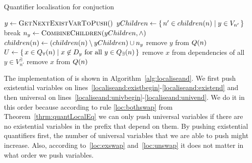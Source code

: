 \documentclass[
  digital, %
  twoside, %
  table,   %
  nolof,     %
  nolot,     %
]{fithesis3}
\let\setbuilder\set
\newcommand{\simpleset}[1]{\{{#1}\}}
\renewcommand{\set}[1]{\normalexpandarg\IfSubStr{#1}{|}{\setbuilder{#1}}{\simpleset{#1}}}
\theoremstyle{definition}
\theoremstyle{remark}
\newcommand{\vars}[1]{V_{#1}}
\newcommand{\evars}[1]{V_{#1}^{\exists}}
\begin{document}
\begin{algorithm}
  \caption{Quantifier localisation for conjuction}
  \label{alg:localiseand}
  \begin{algorithmic}[1]
      \label{localiseand:existbegin}
        \State $y \gets \Call{GetNextExistVarToPush}{\null}$\label{localiseand:getevar}
        \State $yChildren \gets \set{n' \in \children{n} | y \in \vars{n'}}$\label{localiseand:egetchildren}
        \label{localiseand:echildtest}%
          \State break
        \Else
          \State $n_y \gets \Call{CombineChildren}{yChildren, {\land}}$\label{localiseand:ecombine}
          \State $children({n}) \gets (children({n}) \setminus yChildren) \cup n_y$\label{localiseand:echildrenupdate}
          \State {}\label{localiseand:epush}
          \State remove $y$ from $Q({n})$\label{localiseand:eremove}
        \EndIf
      \EndWhile\label{localiseand:existend}
      \State $U \gets \set{x \in \uprefix{n} | x \not\in D_y \text{ for all } y \in \eprefix{n}}$\label{localiseand:upossible}
      \label{localiseand:univbegin}
            \State {}\label{localiseand:upush}
          \Else
            \State remove $x$ from dependencies of all $y \in \evars{n'}$\label{localiseand:uremovedep}
          \EndIf
        \EndFor
        \State remove $x$ from $Q({n})$\label{localiseand:uremove}
      \EndFor\label{localiseand:univend}
    \EndFunction
  \end{algorithmic}
\end{algorithm}

The implementation of  is shown in Algorithm~\ref{alg:localiseand}. We first push existential variables on lines~\ref{localiseand:existbegin}-\ref{localiseand:existend} and then universal on lines~\ref{localiseand:univbegin}-\ref{localiseand:univend}. We do it in this order because according to rule \eqref{loc:bothswap} from Theorem~\ref{thrm:quantLocalEq} we can only push universal variables if there are no existential variables in the prefix that depend on them. By pushing existential quantifiers first, the number of universal variables that we are able to push might increase. Also, according to~\eqref{loc:exswap} and~\eqref{loc:unswap} it does not matter in what order we push variables.
\end{document}
